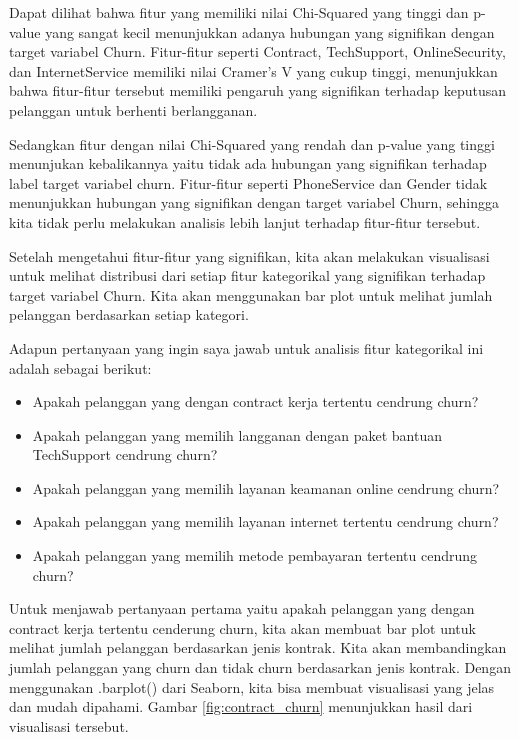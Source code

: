 Dapat dilihat bahwa fitur yang memiliki nilai Chi-Squared yang tinggi dan p-value yang sangat kecil menunjukkan adanya hubungan yang signifikan dengan target variabel Churn. Fitur-fitur seperti Contract, TechSupport, OnlineSecurity, dan InternetService memiliki nilai Cramer's V yang cukup tinggi, menunjukkan bahwa fitur-fitur tersebut memiliki pengaruh yang signifikan terhadap keputusan pelanggan untuk berhenti berlangganan.

Sedangkan fitur dengan nilai Chi-Squared yang rendah dan p-value yang tinggi menunjukan kebalikannya yaitu tidak ada hubungan yang signifikan terhadap label target variabel churn. Fitur-fitur seperti PhoneService dan Gender tidak menunjukkan hubungan yang signifikan dengan target variabel Churn, sehingga kita tidak perlu melakukan analisis lebih lanjut terhadap fitur-fitur tersebut. 

Setelah mengetahui fitur-fitur yang signifikan, kita akan melakukan visualisasi untuk melihat distribusi dari setiap fitur kategorikal yang signifikan terhadap target variabel Churn. Kita akan menggunakan bar plot untuk melihat jumlah pelanggan berdasarkan setiap kategori.

Adapun pertanyaan yang ingin saya jawab untuk analisis fitur kategorikal ini adalah sebagai berikut:
\begin{itemize}
    \item Apakah pelanggan yang dengan contract kerja tertentu cendrung churn?
    \item Apakah pelanggan yang memilih langganan dengan paket bantuan TechSupport cendrung churn?
    \item Apakah pelanggan yang memilih layanan keamanan online cendrung churn?
    \item Apakah pelanggan yang memilih layanan internet tertentu cendrung churn?
    \item Apakah pelanggan yang memilih metode pembayaran tertentu cendrung churn?
\end{itemize}

Untuk menjawab pertanyaan pertama yaitu apakah pelanggan yang dengan contract kerja tertentu cenderung churn, kita akan membuat bar plot untuk melihat jumlah pelanggan berdasarkan jenis kontrak. Kita akan membandingkan jumlah pelanggan yang churn dan tidak churn berdasarkan jenis kontrak. Dengan menggunakan .barplot() dari Seaborn, kita bisa membuat visualisasi yang jelas dan mudah dipahami. Gambar \ref{fig:contract_churn} menunjukkan hasil dari visualisasi tersebut.

